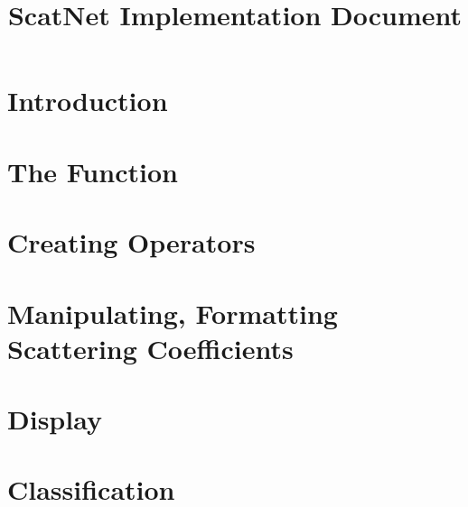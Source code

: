 \documentclass[twocolumn]{article}
\title{ScatNet Implementation Document}
\begin{document}
	
\maketitle

\section{Introduction}

\section{The  Function}

\section{Creating Operators}

\section{Manipulating, Formatting Scattering Coefficients}

\section{Display}

\section{Classification}
\end{document}
